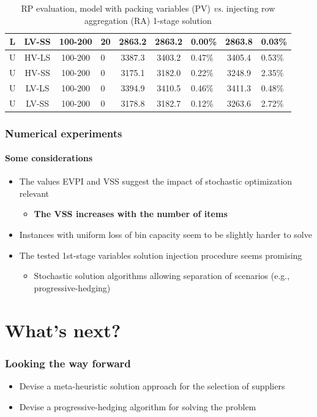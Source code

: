 \documentclass[,9pt,xcolor={dvipsnames}]{beamer} %
\begin{document}
\begin{frame}
\begin{table}[h!]
\begin{tabular}{c c c f c c f c j}
			L & LV-SS & 100-200 & 20 & 2863.2 & 2863.2 & 0.00\% & 2863.8 & 0.03\% \\
			\hline
			U & HV-LS & 100-200 & 0 & 3387.3 & 3403.2 & 0.47\% & 3405.4 & 0.53\% \\
			U & HV-SS & 100-200 & 0 & 3175.1 & 3182.0 & 0.22\% & 3248.9 & 2.35\% \\
			U & LV-LS & 100-200 & 0 & 3394.9 & 3410.5 & 0.46\% & 3411.3 & 0.48\% \\
			U & LV-SS & 100-200 & 0 & 3178.8 & 3182.7 & 0.12\% & 3263.6 & 2.72\% \\
			\hline
		\end{tabular}
		\caption{RP evaluation, model with packing variables (PV) \textit{vs.} injecting row aggregation (RA) 1-stage solution}
		\label{tab:optres4}
	\end{table}
\end{frame}

\begin{frame}%
	\frametitle{Numerical experiments}
	\framesubtitle{Some considerations}	
	\begin{itemize}
		\item<1-> The values EVPI and VSS suggest the impact of stochastic optimization relevant
		\begin{itemize}
			\item<1-> \textbf{The VSS increases with the number of items}
		\end{itemize}
		\bigskip
		\item<2-> Instances with uniform loss of bin capacity seem to be slightly harder to solve
		\bigskip
		\item<3-> The tested 1st-stage variables solution injection procedure seems promising
		\begin{itemize}
			\item<3-> Stochastic solution algorithms allowing separation of scenarios (e.g., progressive-hedging)
		\end{itemize}
	\end{itemize}
\end{frame}

\section {What's next?}
\begin{frame}%
	\frametitle{Looking the way forward}
	\begin{itemize}
		\item<1-> Devise a meta-heuristic solution approach for the selection of suppliers 
		\bigskip
		\item<2-> Devise a progressive-hedging algorithm for solving the problem
	\end{itemize}
\end{frame}
\end{document}
